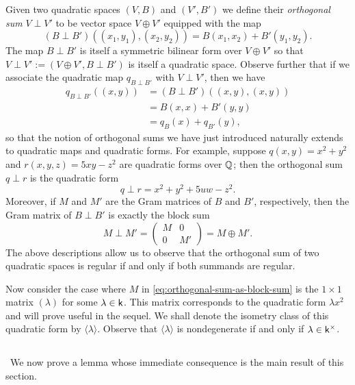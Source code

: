 Given two quadratic spaces \((V, B)\) and \((V', B')\) we define their
\emph{orthogonal sum} \(V \perp V'\) to be vector space \(V \oplus V'\) equipped
with the map\label{sec:orthogonal-sum}
\[ 
  (B \perp B')((x_1, y_1), (x_2, y_2)) = B(x_1, x_2) + B'(y_1, y_2).
\]
The map \(B \perp B'\) is itself a symmetric bilinear form over \(V \oplus V'\)
so that \(V \perp V' := (V \oplus V', B \perp B')\) is itself a quadratic space.
Observe further that if we associate the quadratic map \(q_{B \perp B'}\) with
\(V \perp V'\), then we have
\begin{align*}
  q_{B \perp B'}((x, y)) &= (B \perp B')((x, y), (x, y))\\
  &= B(x, x) + B'(y, y)\\
  &= q_B(x) + q_{B'}(y),
\end{align*}
so that the notion of orthogonal sums we have just introduced naturally extends
to quadratic maps and quadratic forms. For example, suppose \(q(x, y) = x^2 +
y^2\) and \(r(x, y, z) = 5xy - z^2\) are quadratic forms over \(\mathbb{Q}\);
then the orthogonal sum \(q \perp r\) is the quadratic form
\[
  q \perp r = x^2 + y^2 + 5uw - z^2.
\]
Moreover, if \(M\) and \(M'\) are the Gram matrices of \(B\) and \(B'\),
respectively, then the Gram matrix of \(B \perp B'\) is exactly the block sum
\begin{equation}\label{eq:orthogonal-sum-as-block-sum}
  M \perp M' =
  \begin{pmatrix}
    M & 0 \\
    0 & M'
  \end{pmatrix}
  = M \oplus M'.
\end{equation}
The above descriptions allow us to observe that the orthogonal sum of two
quadratic spaces is regular if and only if both summands are regular.

Now consider the case where \(M\) in \eqref{eq:orthogonal-sum-as-block-sum} is
the \(1 \times 1\) matrix \((\lambda)\) for some \(\lambda \in \mathsf{k}\). This
matrix corresponds to the quadratic form \(\lambda x^2\) and will prove useful
in the sequel. We shall denote the isometry class of this quadratic form by
\(\langle \lambda \rangle\). Observe that \(\langle \lambda \rangle\) is
nondegenerate if and only if \(\lambda \in \mathsf{k}^{\times}\).

\subsection{}~We now prove a lemma whose immediate consequence is the main
result of this section.\label{sec:diagonalization-of-forms}


